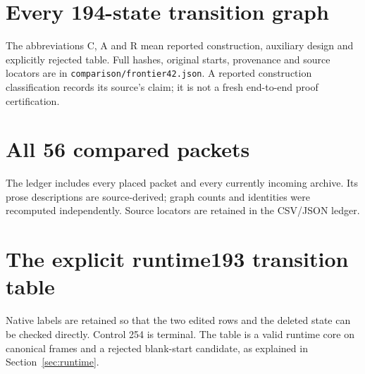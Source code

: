 \documentclass[11pt,letterpaper]{article}
\newcommand{\file}[1]{\texttt{\nolinkurl{#1}}}
\begin{document}
\clearpage
\appendix
\section{Every 194-state transition graph}\label{app:frontier}
The abbreviations C, A and R mean reported construction, auxiliary design
and explicitly rejected table. Full hashes, original starts, provenance
and source locators are in \file{comparison/frontier42.json}. A reported
construction classification records its source's claim; it is not a fresh
end-to-end proof certification.

\section{All 56 compared packets}\label{app:packets}
The ledger includes every placed packet and every currently incoming archive.
Its prose descriptions are source-derived; graph counts and identities were
recomputed independently. Source locators are retained in the CSV/JSON ledger.

\clearpage
\section{The explicit runtime193 transition table}\label{app:table}
Native labels are retained so that the two edited rows and the deleted state
can be checked directly. Control 254 is terminal. The table is a valid runtime
core on canonical frames and a rejected blank-start candidate, as explained
in Section~\ref{sec:runtime}.

\end{document}
